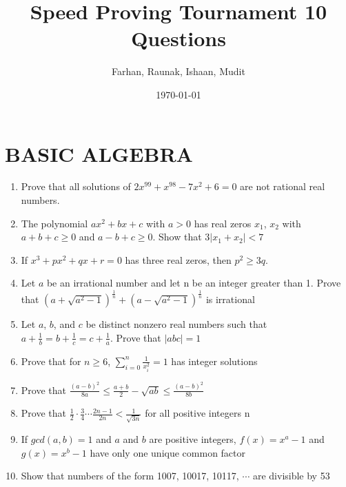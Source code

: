\documentclass[12pt]{article}
\title{Speed Proving Tournament 10 Questions}
\author{Farhan, Raunak, Ishaan, Mudit}
\date{\today}
\newcommand\ddfrac[2]{\frac{\displaystyle #1}{\displaystyle #2}}
\begin{document}
\doublespacing
\maketitle
\section{BASIC ALGEBRA}

\begin{enumerate}
    \item Prove that all solutions of $2x^{99}+x^{98}-7x^{2}+6=0$ are not rational real numbers.
    \item The polynomial $ax^{2}+bx+c$ with $a>0$ has real zeros $x_{1}$, $x_{2}$ with $a+b+c\geq0$ and $a-b+c\geq0$. Show that $3|x_{1}+x_{2}|<7$
    \item If $x^{3}+px^{2}+qx+r=0$ has three real zeros, then $p^{2}\geq3q$.
    \item Let $a$ be an irrational number and let n be an integer greater than 1. Prove that $(a+\sqrt{a^{2}-1})^{\frac{1}{n}}+(a-\sqrt{a^{2}-1})^{\frac{1}{n}}$ is irrational
    \item Let $a$, $b$, and $c$ be distinct nonzero real numbers such that $a+\frac{1}{b}=b+\frac{1}{c}=c+\frac{1}{a}$. Prove that $|abc|=1$
    \item Prove that for $n\geq6$, $\displaystyle\sum_{i=0}^{n} \ddfrac{1}{x_{i}^{2}}=1$ has integer solutions
    \item Prove that $\frac{(a-b)^{2}}{8a}\leq\frac{a+b}{2}-\sqrt{ab}\leq\frac{(a-b)^{2}}{8b}$
    \item Prove that $\frac{1}{2}\cdot\frac{3}{4}\cdots\frac{2n-1}{2n}<\frac{1}{\sqrt{3n}}$ for all positive integers n
    \item If $gcd(a,b)=1$ and $a$ and $b$ are positive integers, $f(x)=x^{a}-1$ and $g(x)=x^{b}-1$ have only one unique common factor
    \item Show that numbers of the form 1007, 10017, 10117, $\cdots$ are divisible by 53
\end{enumerate}
\end{document}
